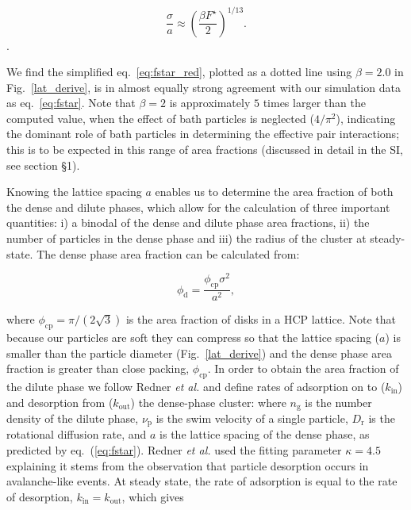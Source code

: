 \documentclass[twoside,twocolumn,9pt]{article}
\begin{document}
\begin{equation}
    \frac{\sigma}{a} \approx \left(\frac{\beta F^\star}{2}\right)^{1/13}.
    \label{eq:fstar_red}
\end{equation}.

We find the simplified eq.~\ref{eq:fstar_red}, plotted as a dotted line using $\beta=2.0$ in Fig.~\ref{lat_derive}, is in almost equally strong agreement with our simulation data as eq.~\ref{eq:fstar}. Note that $\beta=2$ is approximately $5$ times larger than 
the computed value, when the effect of bath particles is neglected ($4/\pi^2$), indicating the dominant role of bath particles in determining the effective pair interactions; this is to be expected in this range of area fractions (discussed in detail in the SI, see section \S 1). 

Knowing the lattice spacing $a$ enables us to determine the area fraction of both the dense and dilute phases, which allow for the calculation of three important quantities: i) a binodal of the dense and dilute phase area fractions, ii) the number of particles in the dense phase and iii) the radius of the cluster at steady-state. The dense phase area fraction can be calculated from: 

\begin{equation}\label{phid}
\phi_\text{d}=\frac{\phi_\text{cp}\sigma^{2}}{a^{2}},
\end{equation}

\noindent where $\phi_\text{cp}=\pi/(2\sqrt{3})$ is the area fraction of disks in a HCP lattice. Note that because our particles are soft they can compress so that the lattice spacing ($a$) is smaller than the particle diameter (Fig.~\ref{lat_derive}) and the dense phase area fraction is greater than close packing, $\phi_\text{cp}$. In order to obtain the area fraction of the dilute phase we follow Redner \textit{et al.}\cite{Redner2013} and define rates of adsorption on to ($k_\text{in}$) and desorption from ($k_\text{out}$) the dense-phase cluster:
% 
 \label{doubleeq}
% 
\noindent where $n_\text{g}$ is the number density of the dilute phase, $\nu_\text{p}$ is the swim velocity of a single particle, $D_\text{r}$ is the rotational diffusion rate, and $a$ is the lattice spacing of the dense phase,  as predicted by eq.~(\ref{eq:fstar}). 
Redner \textit{et al.}\cite{Redner2013} used the fitting parameter $\kappa=4.5$ explaining it stems from the observation that particle desorption occurs in avalanche-like events. At steady state, the rate of adsorption is equal to the rate of desorption,
$k_\text{in}=k_\text{out}$, which gives
\end{document}
